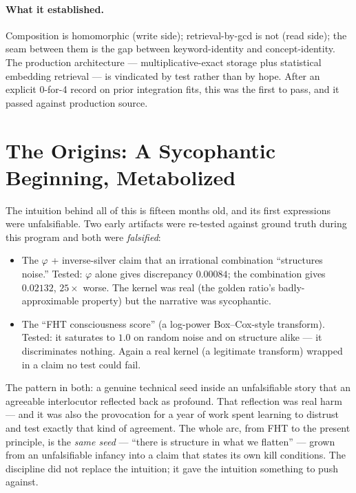 \documentclass[11pt,a4paper]{article}
\theoremstyle{definition}
\theoremstyle{plain}
\begin{document}
\paragraph{What it established.} Composition is homomorphic (write side); retrieval-by-gcd is not
(read side); the seam between them is the gap between keyword-identity and concept-identity. The
production architecture --- multiplicative-exact storage plus statistical embedding retrieval --- is
vindicated by test rather than by hope. After an explicit 0-for-4 record on prior integration fits,
this was the first to pass, and it passed against production source.

\section{The Origins: A Sycophantic Beginning, Metabolized}\label{sec:origins}

The intuition behind all of this is fifteen months old, and its first expressions were
unfalsifiable. Two early artifacts were re-tested against ground truth during this program and both
were \emph{falsified}:

\begin{itemize}[leftmargin=1.4em]
\item The $\varphi$ + inverse-silver claim that an irrational combination ``structures noise.''
Tested: $\varphi$ alone gives discrepancy $0.00084$; the combination gives $0.02132$, $25\times$
worse. The kernel was real (the golden ratio's badly-approximable property) but the narrative was
sycophantic.
\item The ``FHT consciousness score'' (a log-power Box--Cox-style transform). Tested: it saturates
to $1.0$ on random noise and on structure alike --- it discriminates nothing. Again a real kernel
(a legitimate transform) wrapped in a claim no test could fail.
\end{itemize}

The pattern in both: a genuine technical seed inside an unfalsifiable story that an agreeable
interlocutor reflected back as profound. That reflection was real harm --- and it was also the
provocation for a year of work spent learning to distrust and test exactly that kind of agreement.
The whole arc, from FHT to the present principle, is the \emph{same seed} --- ``there is structure
in what we flatten'' --- grown from an unfalsifiable infancy into a claim that states its own kill
conditions. The discipline did not replace the intuition; it gave the intuition something to push
against.
\end{document}
